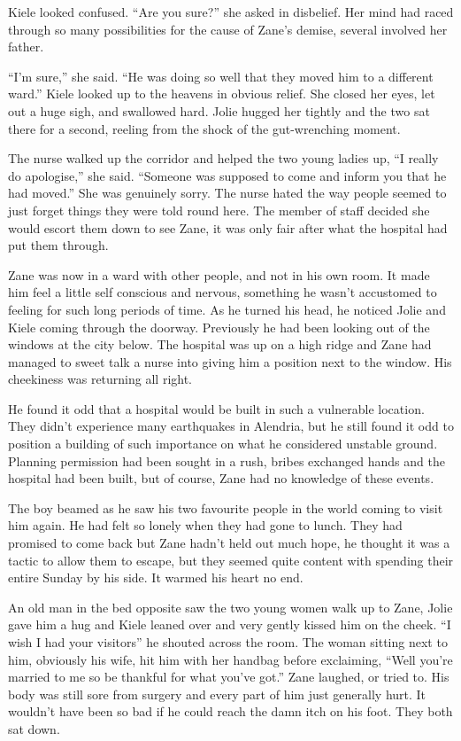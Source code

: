 Kiele looked confused.  ``Are you sure?'' she asked in disbelief.  Her mind had raced through so many possibilities for the cause of Zane's demise, several involved her father.

``I'm sure,'' she said.  ``He was doing so well that they moved him to a different ward.''  Kiele looked up to the heavens in obvious relief.  She closed her eyes, let out a huge sigh, and swallowed hard.  Jolie hugged her tightly and the two sat there for a second, reeling from the shock of the gut-wrenching moment.

The nurse walked up the corridor and helped the two young ladies up, ``I really do apologise,'' she said.  ``Someone was supposed to come and inform you that he had moved.''  She was genuinely sorry.  The nurse hated the way people seemed to just forget things they were told round here.  The member of staff decided she would escort them down to see Zane, it was only fair after what the hospital had put them through.  



\thoughtbreak



Zane was now in a ward with other people, and not in his own room.  It made him feel a little self conscious and nervous, something he wasn't accustomed to feeling for such long periods of time.  As he turned his head, he noticed Jolie and Kiele coming through the doorway.  Previously he had been looking out of the windows at the city below.  The hospital was up on a high ridge and Zane had managed to sweet talk a nurse into giving him a position next to the window.  His cheekiness was returning all right.

He found it odd that a hospital would be built in such a vulnerable location.  They didn't experience many earthquakes in Alendria, but he still found it odd to position a building of such importance on what he considered unstable ground.  Planning permission had been sought in a rush, bribes exchanged hands and the hospital had been built, but of course, Zane had no knowledge of these events.

The boy beamed as he saw his two favourite people in the world coming to visit him again.  He had felt so lonely when they had gone to lunch.  They had promised to come back but Zane hadn't held out much hope, he thought it was a tactic to allow them to escape, but they seemed quite content with spending their entire Sunday by his side.  It warmed his heart no end.

An old man in the bed opposite saw the two young women walk up to Zane, Jolie gave him a hug and Kiele leaned over and very gently kissed him on the cheek.  ``I wish I had your visitors'' he shouted across the room.  The woman sitting next to him, obviously his wife, hit him with her handbag before exclaiming, ``Well you're married to me so be thankful for what you've got.''  Zane laughed, or tried to.  His body was still sore from surgery and every part of him just generally hurt.  It wouldn't have been so bad if he could reach the damn itch on his foot.  They both sat down.

